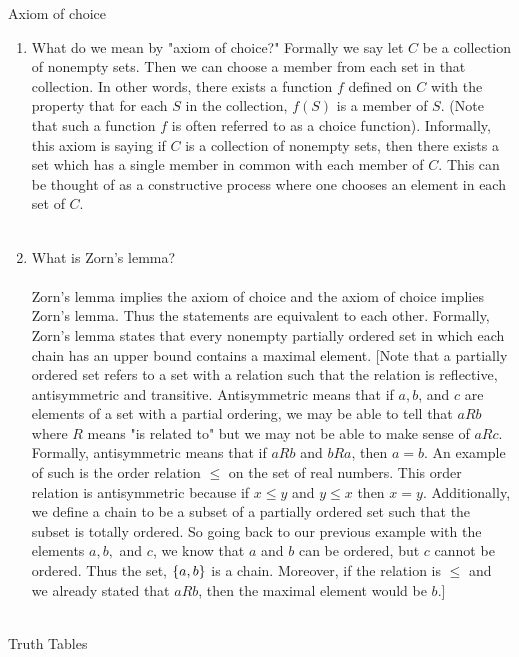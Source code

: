 \documentclass[12pt]{article}
\begin{document}
\problem Axiom of choice
\begin{enumerate}
\item What do we mean by "axiom of choice?" Formally we say let $C$ be a collection of nonempty sets. Then we can choose a member from each set in that collection. In other words, there exists a function $f$ defined on $C$ with the property that for each $S$ in the collection, $f(S)$ is a member of $S$. (Note that such a function $f$ is often referred to as a choice function). Informally, this axiom is saying if $C$ is a collection of nonempty sets, then there exists a set which has a single member in common with each member of $C$. This can be thought of as a constructive process where one chooses an element in each set of $C$. \\ \\

\item What is Zorn's lemma?\\ \\Zorn's lemma implies the axiom of choice and the axiom of choice implies Zorn's lemma. Thus the statements are equivalent to each other. Formally, Zorn's lemma states that every nonempty partially ordered set in which each chain has an upper bound contains a maximal element. [Note that a partially ordered set refers to a set with a  relation such that the relation is reflective, antisymmetric and transitive. Antisymmetric means that if $a,b$, and $c$ are elements of a set with a partial ordering, we may be able to tell that $aRb$ where $R$ means "is related to" but we may not be able to make sense of $aRc$. Formally, antisymmetric means that if $aRb$ and $bRa$, then $a=b$. An example of such is the order relation $\leq$ on the set of real numbers. This order relation is antisymmetric because if $x \leq y$ and $y \leq x$ then $x=y$. Additionally, we define a chain to be a subset of a partially ordered set such that the subset is totally ordered. So going back to our previous example with the elements $a,b,$ and $c$, we know that $a$ and $b$ can be ordered, but $c$ cannot be ordered. Thus the set, $\left\{a,b\right\}$ is a chain. Moreover, if the relation is $\leq$ and we already stated that $aRb$, then the maximal element would be $b$.]
\end{enumerate} ~\\
\problem Truth Tables
\end{document}
